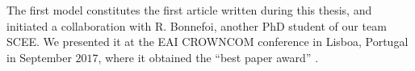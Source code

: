 The first model constitutes the first article written during this thesis, and initiated a collaboration with R. Bonnefoi, another PhD student of our team SCEE.
We presented it at the EAI CROWNCOM conference in Lisboa, Portugal in September $2017$, where it obtained the ``best paper award'' \cite{Bonnefoi17}.
%
